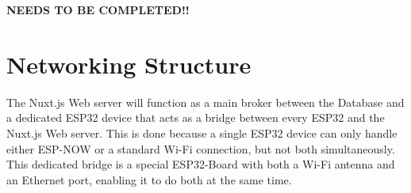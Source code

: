         \textbf{NEEDS TO BE COMPLETED!!}

\section{Networking Structure}
The Nuxt.js Web server will function as a main broker between
the Database and a dedicated ESP32 device that  acts
as a bridge between every ESP32 and the Nuxt.js Web server.
This is done because a single ESP32 device can only handle
either ESP-NOW or a standard Wi-Fi connection, but not both
simultaneously. This dedicated bridge is a special 
ESP32-Board with both a Wi-Fi antenna and an Ethernet port,
enabling it to do both at the same time. 

    